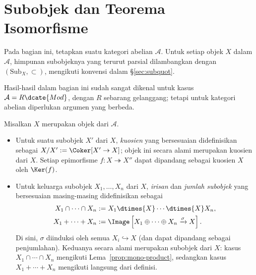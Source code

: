 
\section{Subobjek dan Teorema Isomorfisme}\label{sec:Abel-cat-subobjects}
\hypertarget{o014.aljabr2.chapter2.subobjects-and-isomorphism-theorems}{ }

Pada bagian ini, tetapkan suatu kategori abelian $\mathcal{A}$. Untuk setiap
objek $X$ dalam $\mathcal{A}$, himpunan subobjeknya yang terurut parsial
dilambangkan dengan $(\mathrm{Sub}_X, \subset)$, mengikuti konvensi dalam
\S\ref{sec:subquot}.

Hasil-hasil dalam bagian ini sudah sangat dikenal untuk kasus
$\mathcal{A}=R\dcate{Mod}$, dengan $R$ sebarang gelanggang; tetapi untuk
kategori abelian diperlukan argumen yang berbeda.

\begin{definisi}\label{def:intersection-sum}
	Misalkan $X$ merupakan objek dari $\mathcal{A}$.
	\begin{itemize}
		\item Untuk suatu subobjek $X'$ dari $X$, \emph{kuosien} yang
		bersesuaian didefinisikan sebagai
		$X/X':=\Coker[X'\to X]$; objek ini secara alami merupakan kuosien
		dari $X$. Setiap epimorfisme
		$f:X\twoheadrightarrow X''$ dapat dipandang sebagai kuosien $X$ oleh
		$\Ker(f)$.
		\item Untuk keluarga subobjek $X_1,\ldots,X_n$ dari $X$, \emph{irisan}
		dan \emph{jumlah subobjek} yang bersesuaian masing-masing didefinisikan
		sebagai
		\begin{align*}
			X_1 \cap \cdots \cap X_n & := X_1 \dtimes{X} \cdots \dtimes{X} X_n, \\
			X_1 + \cdots + X_n & := \Image\left[ X_1 \oplus \cdots \oplus X_n \xrightarrow{\sigma} X \right].
		\end{align*}
		Di sini, $\sigma$ diinduksi oleh semua $X_i\hookrightarrow X$ (dan dapat
		dipandang sebagai penjumlahan). Keduanya secara alami merupakan subobjek
		dari $X$: kasus $X_1\cap\cdots\cap X_n$ mengikuti
		Lema~\ref{prop:mono-product}, sedangkan kasus $X_1+\cdots+X_n$ mengikuti
		langsung dari definisi.
	\end{itemize}
\end{definisi}

